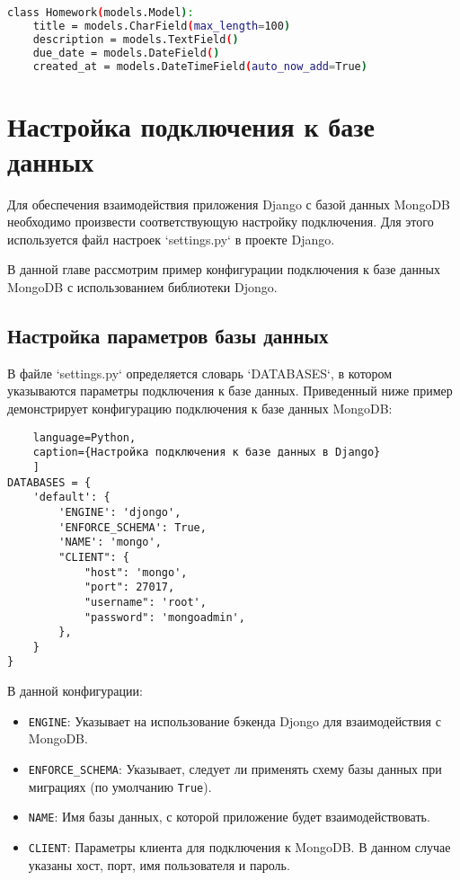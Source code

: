 \begin{lstlisting}[language=bash]
class Homework(models.Model):
    title = models.CharField(max_length=100)
    description = models.TextField()
    due_date = models.DateField()
    created_at = models.DateTimeField(auto_now_add=True)
\end{lstlisting}

\section{Настройка подключения к базе данных}

Для обеспечения взаимодействия приложения Django
с базой данных MongoDB необходимо произвести соответствующую настройку
подключения. Для этого используется файл настроек `settings.py`
в проекте Django.\par
В данной главе рассмотрим пример конфигурации подключения
к базе данных MongoDB с использованием библиотеки Djongo.

\subsection{Настройка параметров базы данных}

В файле `settings.py` определяется словарь `DATABASES`,
в котором указываются параметры подключения к базе данных.
Приведенный ниже пример демонстрирует конфигурацию подключения
к базе данных MongoDB:

\begin{lstlisting}
	language=Python,
	caption={Настройка подключения к базе данных в Django}
	]
DATABASES = {
    'default': {
        'ENGINE': 'djongo',
        'ENFORCE_SCHEMA': True,
        'NAME': 'mongo',
        "CLIENT": {
            "host": 'mongo',
            "port": 27017,
            "username": 'root',
            "password": 'mongoadmin',
        },
    }
}
\end{lstlisting}

В данной конфигурации:

\begin{itemize}
    \item \texttt{ENGINE}: Указывает на использование бэкенда Djongo
		для взаимодействия с MongoDB.
    \item \texttt{ENFORCE\_SCHEMA}: Указывает, следует ли применять
		схему базы данных при миграциях (по умолчанию \texttt{True}).
    \item \texttt{NAME}: Имя базы данных,
		с которой приложение будет взаимодействовать.
    \item \texttt{CLIENT}: Параметры клиента для подключения к MongoDB.
		В данном случае указаны хост, порт, имя пользователя и пароль.
\end{itemize}

